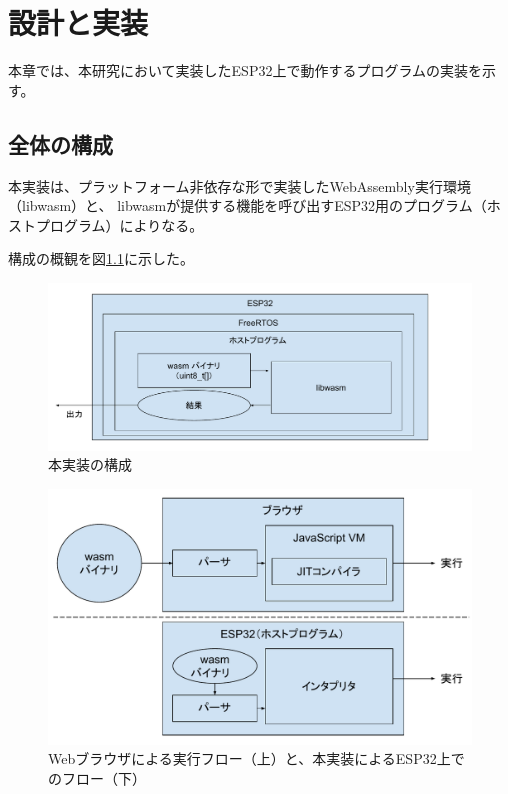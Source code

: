 \chapter{設計と実装}
\label{chap:implementation}

本章では、本研究において実装したESP32上で動作するプログラムの実装を示す。

\section{全体の構成}

本実装は、プラットフォーム非依存な形で実装したWebAssembly実行環境（libwasm）と、
libwasmが提供する機能を呼び出すESP32用のプログラム（ホストプログラム）によりなる。

構成の概観を図\ref{fig:esp32_libwasm}に示した。

\begin{figure}[htbp]
  \caption{本実装の構成}
  \label{fig:esp32_libwasm}
  \begin{center}
    \includegraphics[bb=0 0 800 300,width=12cm]{img/esp32_libwasm.pdf}
  \end{center}
\end{figure}

\begin{figure}[htbp]
  \caption{Webブラウザによる実行フロー（上）と、本実装によるESP32上でのフロー（下）}
  \label{fig:browser_vs_libwasm}
  \begin{center}
    \includegraphics[bb=0 0 706 427,width=15cm]{img/browser_vs_libwasm.pdf}
  \end{center}
\end{figure}


